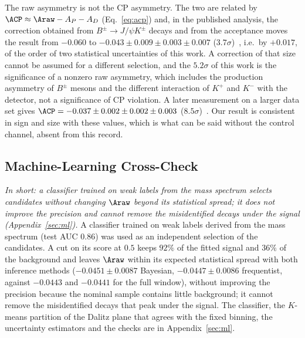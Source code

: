 The raw asymmetry is not the CP asymmetry. The two are related by $\ACP\approx\Araw-A_P-A_D$ (Eq.~\eqref{eq:acp}) and, in the published analysis, the correction obtained from $B^\pm\to J/\psi K^\pm$ decays and from the acceptance moves the result from $-0.060$ to $-0.043\pm0.009\pm0.003\pm0.007$ ($3.7\sigma$)~\cite{lhcb_cpv_2013}, i.e.\ by $+0.017$, of the order of two statistical uncertainties of this work. A correction of that size cannot be assumed for a different selection, and the $5.2\sigma$ of this work is the significance of a nonzero raw asymmetry, which includes the production asymmetry of $B^\pm$ mesons and the different interaction of $K^+$ and $K^-$ with the detector, not a significance of CP violation. A later measurement on a larger data set gives $\ACP=-0.037\pm0.002\pm0.002\pm0.003$ ($8.5\sigma$)~\cite{lhcb_cpv_prd2023,lhcb_cpv_paper}. Our result is consistent in sign and size with these values, which is what can be said without the control channel, absent from this record.

\subsection{Machine-Learning Cross-Check}
\label{sec:comparison_mlcheck}
\emph{In short: a classifier trained on weak labels from the mass spectrum selects candidates without changing $\Araw$ beyond its statistical spread; it does not improve the precision and cannot remove the misidentified decays under the signal (Appendix~\ref{sec:ml}).}
A classifier trained on weak labels derived from the mass spectrum (test AUC $0.86$) was used as an independent selection of the candidates. A cut on its score at $0.5$ keeps $92\%$ of the fitted signal and $36\%$ of the background and leaves $\Araw$ within its expected statistical spread with both inference methods ($-0.0451\pm0.0087$ Bayesian, $-0.0447\pm0.0086$ frequentist, against $-0.0443$ and $-0.0441$ for the full window), without improving the precision because the nominal sample contains little background; it cannot remove the misidentified decays that peak under the signal. The classifier, the $K$-means partition of the Dalitz plane that agrees with the fixed binning, the uncertainty estimators and the checks are in Appendix~\ref{sec:ml}.

